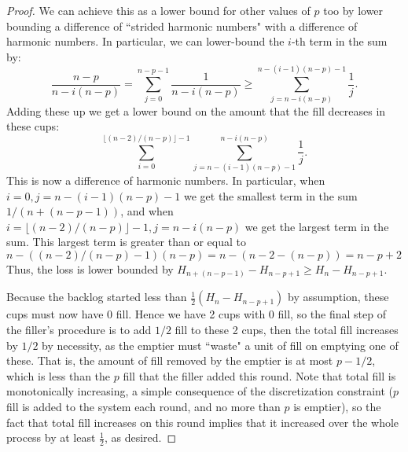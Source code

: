 \documentclass{article}[11pt]
\begin{document}
\begin{proof}
We can achieve this as a lower bound for other values of $p$ too by lower
bounding a difference of ``strided harmonic numbers" with a difference of
harmonic numbers.
In particular, we can lower-bound the $i$-th term in the sum by:
$$\frac{n-p}{n-i(n-p)} = \sum_{j=0}^{n-p-1} \frac{1}{n-i(n-p)} \ge \sum_{j=n-i(n-p)}^{n-(i-1)(n-p)-1}\frac{1}{j}.$$
Adding these up we get a lower bound on the amount that the fill decreases in these cups:
$$\sum_{i=0}^{\lfloor(n-2) / (n-p)\rfloor - 1} \sum_{j=n-(i-1)(n-p)-1}^{n-i(n-p)}\frac{1}{j}.$$
This is now a difference of harmonic numbers. In particular, when $i=0,
j=n-(i-1)(n-p)-1$ we get the smallest term in the sum $1/(n+(n-p-1))$,
and when $i = \lfloor(n-2) / (n-p)\rfloor - 1, j=n-i(n-p)$ we get the largest
term in the sum. This largest term is greater than or equal to $n - ((n-2) /
(n-p)-1) (n-p) = n - (n-2 -(n-p)) = n-p+2$
Thus, the loss is lower bounded by $H_{n+(n-p-1)} - H_{n-p+1} \ge H_{n} - H_{n-p+1}$.

Because the backlog started less than $\frac{1}{2} (H_n - H_{n-p+1})$ by assumption, these cups must
now have $0$ fill.  Hence we have 2 cups with $0$ fill, so the final step of
the filler's procedure is to add $1/2$ fill to these 2 cups, then the total
fill increases by $1/2$ by necessity, as the emptier must ``waste" a unit of
fill on emptying one of these. That is, the amount of fill removed by the
emptier is at most $p-1/2$, which is less than the $p$ fill that the filler added this round. 
Note that total fill is monotonically increasing, a simple
consequence of the discretization constraint ($p$ fill is added to the system
each round, and no more than $p$ is emptier), so the fact that total fill
increases on this round implies that it increased over the whole process by at least $\frac{1}{2}$, as desired.
\end{proof}
\end{document}
